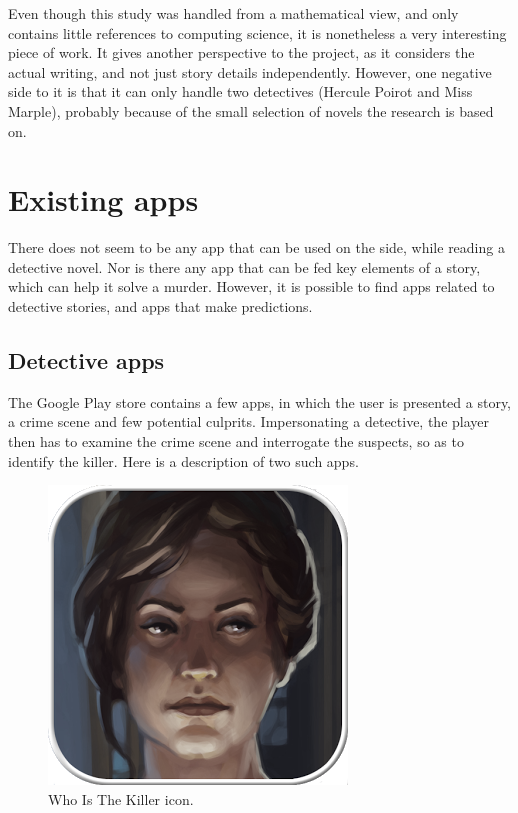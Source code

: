 \documentclass{mproj}
\begin{document}
Even though this study was handled from a mathematical view, and only contains little references to computing science, it is nonetheless a very interesting piece of work. It gives another perspective to the project, as it considers the actual writing, and not just story details independently. However, one negative side to it is that it can only handle two detectives (Hercule Poirot and Miss Marple), probably because of the small selection of novels the research is based on.

\section{Existing apps}

There does not seem to be any app that can be used on the side, while reading a detective novel. Nor is there any app that can be fed key elements of a story, which can help it solve a murder. However, it is possible to find apps related to detective stories, and apps that make predictions.

\subsection*{Detective apps}

The Google Play store contains a few apps, in which the user is presented a story, a crime scene and few potential culprits. Impersonating a detective, the player then has to examine the crime scene and interrogate the suspects, so as to identify the killer. Here is a description of two such apps. \par

\begin{figure}
	\vspace{-10pt}
	\centering
	\includegraphics[scale=0.25]{images/whoisthekiller_icon}
	\caption{Who Is The Killer icon.}
	\vspace{-25pt}
\end{figure}
\end{document}
